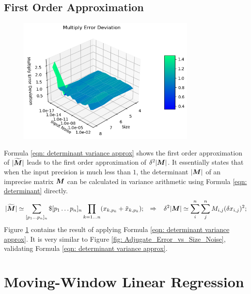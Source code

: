 \documentclass[twoside]{article}
\numberwithin{equation}{section}
\newcommand{\eqspace}{\;\;\;}
\begin{document}
\subsection{First Order Approximation}

\begin{figure}[p]
\centering
\includegraphics[height=2.5in]{Multiply_Error_vs_Size_Noise.png} 
\label{fig: Multiply_Error_vs_Size_Noise}
\end{figure}

Formula \eqref{eqn: determinant variance approx} shows the first order approximation of $|\widetilde{\protect{\textrm{\boldmath $M$}}}|$ leads to the first order approximation of $\delta^2 |\protect{\textrm{\boldmath $M$}}|$.   
It essentially states that when the input precision is much less than $1$, the determinant $|\protect{\textrm{\boldmath $M$}}|$ of an imprecise matrix $\protect{\textrm{\boldmath $M$}}$ can be calculated in variance arithmetic using Formula \eqref{eqn: determinant} directly.
\begin{equation}
\label{eqn: determinant variance approx}
|\widetilde{\M}| \simeq \sum_{[p_1\dots p_n]_n} \$ [p_1\dots p_n]_n \prod_{k=1 \dots n} (x_{k,p_k} + \tilde{x}_{k,p_k}); \eqspace \Rightarrow  \eqspace
	\delta^2 |\M| \simeq \sum_{i}^{n} \sum_{j}^{n} M_{i,j} (\delta x_{i,j})^2;
\end{equation}
Figure \ref{fig: Multiply_Error_vs_Size_Noise} contains the result of applying Formula \eqref{eqn: determinant variance approx}.
It is very similar to Figure \ref{fig: Adjugate_Error_vs_Size_Noise}, validating Formula \eqref{eqn: determinant variance approx}.






\clearpage
\section{Moving-Window Linear Regression}
\label{sec: Moving-Window Linear Regression}
\end{document}
